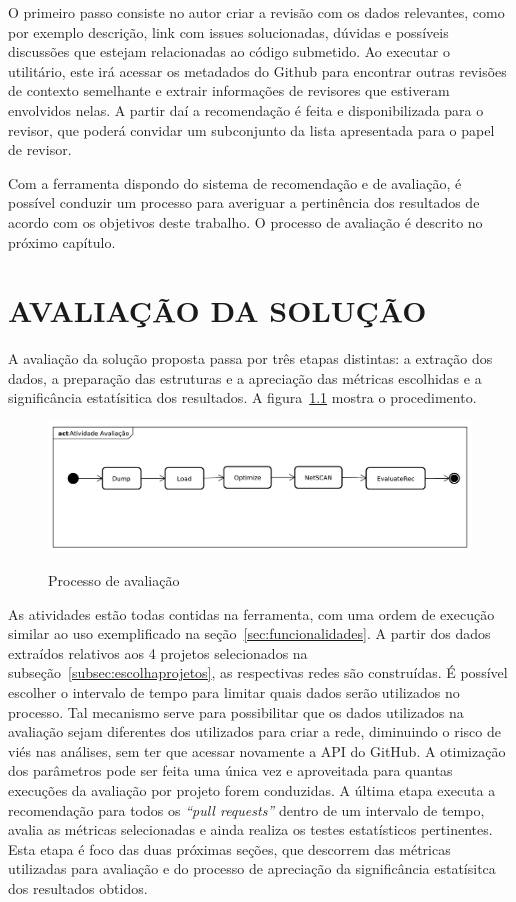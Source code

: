 \documentclass[12pt,openany,oneside,a4paper,english,brazil]{abntbibufjf}
\begin{document}
  O primeiro passo consiste no autor criar a revisão com os dados relevantes, como por exemplo descrição, link com issues solucionadas, dúvidas e possíveis discussões que estejam relacionadas ao código submetido. Ao executar o utilitário, este irá acessar os metadados do Github para encontrar outras revisões de contexto semelhante e extrair informações de revisores que estiveram envolvidos nelas. A partir daí a recomendação é feita e disponibilizada para o revisor, que poderá convidar um subconjunto da lista apresentada para o papel de revisor.

  Com a ferramenta dispondo do sistema de recomendação e de avaliação, é possível conduzir um processo para averiguar a pertinência dos resultados  de acordo com os objetivos deste trabalho. O processo de avaliação é descrito no próximo capítulo.

\chapter{AVALIAÇÃO DA SOLUÇÃO}\label{chap:resultados}
    A avaliação da solução proposta passa por três etapas distintas: a extração dos dados, a preparação das estruturas e a apreciação das métricas escolhidas e a significância estatísitica dos resultados. A figura~\ref{fig:avaliacao} mostra o procedimento.

     \begin{figure}[!htbp]
      \includegraphics[width=\textwidth]{avaliacao}\label{fig:avaliacao}
      \caption{Processo de avaliação}
    \end{figure}

    As atividades estão todas contidas na ferramenta, com uma ordem de execução similar ao uso exemplificado na seção~\ref{sec:funcionalidades}. A partir dos dados extraídos relativos aos 4 projetos selecionados na subseção~\ref{subsec:escolhaprojetos}, as respectivas redes são construídas. É possível escolher o intervalo de tempo para limitar quais dados serão utilizados no processo. Tal mecanismo serve para possibilitar que os dados utilizados na avaliação sejam diferentes dos utilizados para criar a rede, diminuindo o risco de viés nas análises, sem ter que acessar novamente a API do GitHub. A otimização dos parâmetros pode ser feita uma única vez e aproveitada para quantas execuções da avaliação por projeto forem conduzidas. A última etapa executa a recomendação para todos os \textit{``pull requests''} dentro de um intervalo de tempo, avalia as métricas selecionadas e ainda realiza os testes estatísticos pertinentes. Esta etapa é foco das duas próximas seções, que descorrem das métricas utilizadas para avaliação e do processo de apreciação da significância estatísitca dos resultados obtidos.
\end{document}
